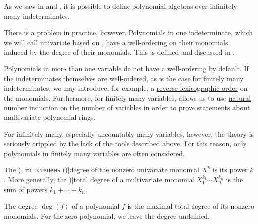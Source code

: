\begin{remark}\label{rem:polynomials_over_infinitely_many_indeterminates}
  As we saw in  and , it is possible to define polynomial algebras over infinitely many indeterminates.

  There is a problem in practice, however. Polynomials in one indeterminate, which we will call univariate based on , have a \hyperref[def:well_ordered_set]{well-ordering} on their monomials, induced by the degree of their monomials. This is defined and discussed in .

  Polynomials in more than one variable do not have a well-ordering by default. If the indeterminates themselves are well-ordered, as is the case for finitely many indeterminates, we may introduce, for example, a \hyperref[def:lexicographic_order]{reverse lexicographic order} on the monomials. Furthermore, for finitely many variables,  allows us to use \hyperref[con:induction/peano_arithmetic]{natural number induction} on the number of variables in order to prove statements about multivariate polynomial rings.

  For infinitely many, especially uncountably many variables, however, the theory is seriously crippled by the lack of the tools described above. For this reason, only polynomials in finitely many variables are often considered.
\end{remark}

\begin{definition}\label{def:polynomial_degree}
  The \term[bg=степен (\cite[1]{Обрешков1962ВисшаАлгебра}), ru=степень (\cite[\S 8.1]{Тыртышников2007ЛинейнаяАлгебра})]{degree} of the nonzero univariate \hyperref[def:polynomial_algebra]{monomial} \( X^k \) is its power \( k \). More generally, the \term[en=total degree (\cite[103]{Lang2002Algebra})]{total degree} of a multivariate monomial \( X_1^{k_1} \cdots X_n^{k_n} \) is the sum of powers \( k_1 + \cdots + k_n \).

  The degree \( \deg(f) \) of a polynomial \( f \) is the maximal total degree of its nonzero monomials. For the zero polynomial, we leave the degree undefined.
\end{definition}

